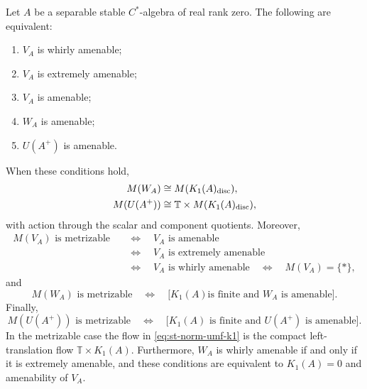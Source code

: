 \begin{theorem}\label{thm:st-norm-dichotomy}
 Let $A$ be a separable stable $C^*$-algebra of
real rank zero. The following are equivalent:

\begin{enumerate}
\item $V_A$ is whirly amenable;

\item $V_A$ is extremely amenable;

\item $V_A$ is amenable;

\item $W_A$ is amenable;

\item $U(A^+)$ is amenable.
\end{enumerate}

When these conditions hold, 
\begin{align}
M(W_A)&\cong M(K_1(A)_{\mathrm{disc}}),  \notag \\
M(U(A^+))&\cong \mathbb{T}\times M(K_1(A)_{\mathrm{disc}}),
\label{eq:st-norm-umf-k1}
\end{align}
with action through the scalar and component quotients. Moreover, 
\begin{equation}  \label{eq:st-va-dichotomy}
\begin{split}
M(V_A)\text{ is metrizable} &\quad\Longleftrightarrow\quad V_A\text{ is
amenable} \\
&\quad\Longleftrightarrow\quad V_A\text{ is extremely amenable}
\\
&\quad\Longleftrightarrow\quad V_A\text{ is whirly amenable}
\quad\Longleftrightarrow\quad M(V_A)=\{*\},
\end{split}\end{equation}
and 
\begin{equation}  \label{eq:st-wa-metrizability}
M(W_A)\text{ is metrizable} \quad\Longleftrightarrow\quad \bigl[K_1(A)\text{
is finite and }W_A\text{ is amenable}\bigr].
\end{equation}
Finally, 
\begin{equation}  \label{eq:st-norm-metrizability}
M(U(A^+))\text{ is metrizable} \quad\Longleftrightarrow\quad \bigl[K_1(A)\text{ is finite and }U(A^+)\text{ is amenable}\bigr].
\end{equation}
In the metrizable case the flow in \eqref{eq:st-norm-umf-k1} is the compact
left-translation flow $\mathbb{T}\times K_1(A)$.
Furthermore, $W_A$ is whirly amenable if and only if it is extremely
amenable, and these conditions are equivalent to $K_1(A)=0$ and
amenability of $V_A$.
\end{theorem}

